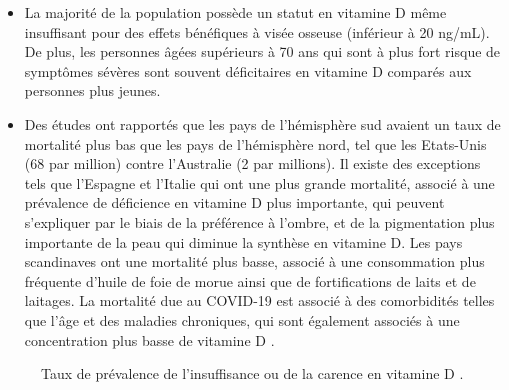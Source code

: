 \documentclass[
  a4paper,
  DIV=11,
  numbers=noendperiod,
  listof=totoc]{scrreprt}
\providecommand{\tightlist}{%
  \setlength{\itemsep}{0pt}\setlength{\parskip}{0pt}}\usepackage{longtable,booktabs,array}
\begin{document}
\begin{itemize}
\tightlist
\item
  La majorité de la population possède un statut en vitamine D même
  insuffisant pour des effets bénéfiques à visée osseuse (inférieur à 20
  ng/mL). De plus, les personnes âgées supérieurs à 70 ans qui sont à
  plus fort risque de symptômes sévères sont souvent déficitaires en
  vitamine D comparés aux personnes plus jeunes.
\item
  Des études ont rapportés que les pays de l'hémisphère sud avaient un
  taux de mortalité plus bas que les pays de l'hémisphère nord, tel que
  les Etats-Unis (68 par million) contre l'Australie (2 par millions).
  Il existe des exceptions tels que l'Espagne et l'Italie qui ont une
  plus grande mortalité, associé à une prévalence de déficience en
  vitamine D plus importante, qui peuvent s'expliquer par le biais de la
  préférence à l'ombre, et de la pigmentation plus importante de la peau
  qui diminue la synthèse en vitamine D. Les pays scandinaves ont une
  mortalité plus basse, associé à une consommation plus fréquente
  d'huile de foie de morue ainsi que de fortifications de laits et de
  laitages. La mortalité due au COVID-19 est associé à des comorbidités
  telles que l'âge et des maladies chroniques, qui sont également
  associés à une concentration plus basse de vitamine D
  \autocite{Bishop.2021}.
\end{itemize}

\begin{figure}


\caption[Taux de prévalence de l'insuffisance ou de la carence en
vitamine D]{\label{fig-vd-covid-deficiency}Taux de prévalence de
l'insuffisance ou de la carence en vitamine D \autocite{Campi.2021}.}

\end{figure}%
\end{document}
